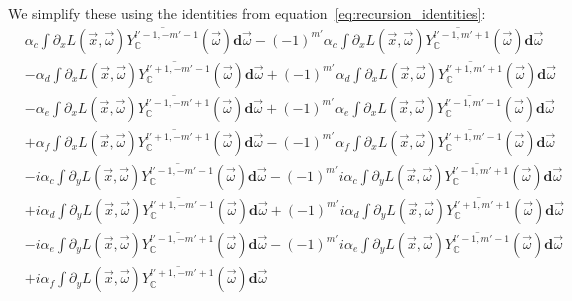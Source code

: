 We simplify these using the identities from equation~\ref{eq:recursion_identities}: 
\begin{align*}
&
\alpha_c\int{\partial_xL\left (\vec{x} ,\vec{\omega} \right )\overline{Y_{\mathbb{C}}^{l'-1, -m'-1}}(\vec{\omega} )\mathbf{d}\vec{\omega}}
-\left({-1}\right)^{m'}\alpha_c\int{\partial_xL\left (\vec{x} ,\vec{\omega} \right )\overline{Y_{\mathbb{C}}^{l'-1, m'+1}}(\vec{\omega} )\mathbf{d}\vec{\omega}}
\\&
-\alpha_d\int{\partial_xL\left (\vec{x} ,\vec{\omega} \right )\overline{Y_{\mathbb{C}}^{l'+1, -m'-1}}(\vec{\omega} )\mathbf{d}\vec{\omega}}
+\left({-1}\right)^{m'}\alpha_d\int{\partial_xL\left (\vec{x} ,\vec{\omega} \right )\overline{Y_{\mathbb{C}}^{l'+1, m'+1}}(\vec{\omega} )\mathbf{d}\vec{\omega}}
\\&
-\alpha_e\int{\partial_xL\left (\vec{x} ,\vec{\omega} \right )\overline{Y_{\mathbb{C}}^{l'-1, -m'+1}}(\vec{\omega} )\mathbf{d}\vec{\omega}}
+\left({-1}\right)^{m'}\alpha_e\int{\partial_xL\left (\vec{x} ,\vec{\omega} \right )\overline{Y_{\mathbb{C}}^{l'-1, m'-1}}(\vec{\omega} )\mathbf{d}\vec{\omega}}
\\&
+\alpha_f\int{\partial_xL\left (\vec{x} ,\vec{\omega} \right )\overline{Y_{\mathbb{C}}^{l'+1, -m'+1}}(\vec{\omega} )\mathbf{d}\vec{\omega}}
-\left({-1}\right)^{m'}\alpha_f\int{\partial_xL\left (\vec{x} ,\vec{\omega} \right )\overline{Y_{\mathbb{C}}^{l'+1, m'-1}}(\vec{\omega} )\mathbf{d}\vec{\omega}}
\\&
-i \alpha_c\int{\partial_yL\left (\vec{x} ,\vec{\omega} \right )\overline{Y_{\mathbb{C}}^{l'-1, -m'-1}}(\vec{\omega} )\mathbf{d}\vec{\omega}}
-\left({-1}\right)^{m'}i \alpha_c\int{\partial_yL\left (\vec{x} ,\vec{\omega} \right )\overline{Y_{\mathbb{C}}^{l'-1, m'+1}}(\vec{\omega} )\mathbf{d}\vec{\omega}}
\\&
+i \alpha_d\int{\partial_yL\left (\vec{x} ,\vec{\omega} \right )\overline{Y_{\mathbb{C}}^{l'+1, -m'-1}}(\vec{\omega} )\mathbf{d}\vec{\omega}}
+\left({-1}\right)^{m'}i \alpha_d\int{\partial_yL\left (\vec{x} ,\vec{\omega} \right )\overline{Y_{\mathbb{C}}^{l'+1, m'+1}}(\vec{\omega} )\mathbf{d}\vec{\omega}}
\\&
-i \alpha_e\int{\partial_yL\left (\vec{x} ,\vec{\omega} \right )\overline{Y_{\mathbb{C}}^{l'-1, -m'+1}}(\vec{\omega} )\mathbf{d}\vec{\omega}}
-\left({-1}\right)^{m'}i \alpha_e\int{\partial_yL\left (\vec{x} ,\vec{\omega} \right )\overline{Y_{\mathbb{C}}^{l'-1, m'-1}}(\vec{\omega} )\mathbf{d}\vec{\omega}}
\\&
+i \alpha_f\int{\partial_yL\left (\vec{x} ,\vec{\omega} \right )\overline{Y_{\mathbb{C}}^{l'+1, -m'+1}}(\vec{\omega} )\mathbf{d}\vec{\omega}}

\end{align*}
